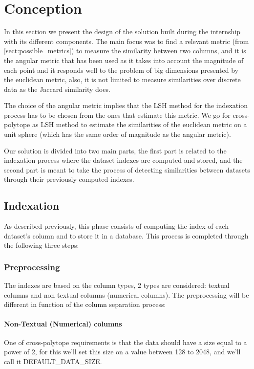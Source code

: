 \chapter{Conception}

In this section we present the design of the solution built during the
internship with its different components. The main focus was to find a relevant
metric (from \ref{sect:possible_metrics}) to measure the similarity between two
columns, and it is the angular metric that has been used as it takes into
account the magnitude of each point and it responds well to the problem of big
dimensions presented by the euclidean metric, also, it is not limited to measure
similarities over discrete data as the Jaccard similarity does.

The choice of the angular metric implies that the LSH method for the indexation
process has to be chosen from the ones that estimate this metric. We go for
cross-polytope as LSH method to estimate the similarities of the euclidean
metric on a unit sphere (which has the same order of magnitude as the angular
metric).

Our solution is divided into two main parts, the first part is related to the
indexation process where the dataset indexes are computed and stored, and the
second part is meant to take the process of detecting similarities between
datasets through their previously computed indexes.


\section{Indexation}
As described previously, this phase consists of computing the index of each
dataset's column and to store it in a database. This process is completed
through the following three steps:

\subsection{Preprocessing}
The indexes are based on the column types, 2 types are considered: textual
columns and non textual columns (numerical columns). The preprocessing will be
different in function of the column separation process:
\subsubsection{Non-Textual (Numerical) columns}
One of cross-polytope requirements is that the data should have a size equal to
a power of 2, for this we'll set this size on a value between 128 to 2048, and
we'll call it \mbox{DEFAULT\_DATA\_SIZE}.

